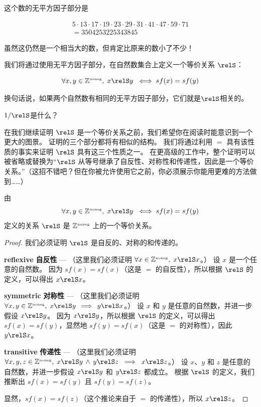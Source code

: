 \noindent 这个数的无平方因子部分是

\begin{gather*} 
5\cdot 13\cdot 17\cdot 19\cdot 23\cdot 29\cdot 31\cdot 41\cdot 47\cdot 59\cdot 71\\
 = 3504253225343845
\end{gather*}

\noindent 虽然这仍然是一个相当大的数，但肯定比原来的数小了不少！

我们将通过使用无平方因子部分，在自然数集合上定义一个等价关系 $\relS$：

\[ \forall x, y \in \Naturals, \;
x \relS y \; \iff sf(x) = sf(y) \]

换句话说，如果两个自然数有相同的无平方因子部分，它们就是$\relS$相关的。

\begin{exer}
$1/\relS$是什么？
\end{exer}

在我们继续证明 $\relS$ 是一个等价关系之前，我们希望你在阅读时能意识到一个更大的图景。
证明的三个部分都将有相似的结构。
我们将通过利用 $=$ 具有该性质的事实来证明 $\relS$ 具有这三个性质之一。
在更高级的工作中，整个证明可以被省略或替换为“$\relS$ 从等号继承了自反性、对称性和传递性，因此是一个等价关系。”（这招不错吧？但在你被允许使用它之前，你必须展示你能用更难的方法做到……）

\begin{thm} 
由
\[ \forall x, y \in \Naturals, \;
x \relS y \; \iff sf(x) = sf(y) \]
\noindent 定义的关系 $\relS$ 是 ${\mathbb Z}^{\mbox{\tiny noneg}}$ 上的一个等价关系。
\end{thm}

\begin{proof}

我们必须证明 $\relS$ 是自反的、对称的和传递的。

{\bf reflexive} {\bf 自反性} --- （这里我们必须证明 $\forall x \in \Naturals, \; x \relS x$。）
设 $x$ 是一个任意的自然数。
因为 $sf(x) = sf(x)$（这是 $=$ 的自反性），所以根据 $\relS$ 的定义，可以得出 $x \relS x$。

{\bf symmetric} {\bf 对称性} --- （这里我们必须证明 $\forall x,y \in \Naturals, \; x \relS y \, \implies \, y \relS x$。）
设 $x$ 和 $y$ 是任意的自然数，并进一步假设 $x \relS y$。
因为 $x \relS y$，所以根据 $\relS$ 的定义，可以得出 $sf(x) = sf(y)$，显然地 $sf(y) = sf(x)$（这是 $=$ 的对称性），因此 $y \relS x$。

{\bf transitive} {\bf 传递性} --- （这里我们必须证明 $\forall x,y,z \in \Naturals, \; x \relS y \, \land \, y \relS z \; \implies \; x \relS z$。）
设 $x$、$y$ 和 $z$ 是任意的自然数，并进一步假设 $x \relS y$ 和 $y \relS z$ 都成立。
根据 $\relS$ 的定义，我们推断出 $sf(x) = sf(y)$ 且 $sf(y) = sf(z)$。

显然，$sf(x) = sf(z)$（这个推论来自于 $=$ 的传递性），所以 $x \relS z$。
\end{proof}

